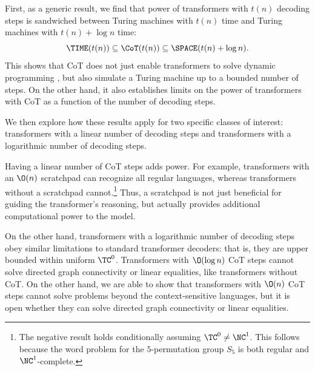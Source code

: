 First, as a generic result, we find that power of transformers with $t(n)$ decoding steps is sandwiched between Turing machines with $t(n)$ time and Turing machines with $t(n) + \log n$ time:
\begin{equation*}
    \TIME(t(n)) \subseteq \CoT(t(n)) \subseteq \SPACE(t(n) + \log n) .
\end{equation*}
This shows that CoT does not just enable transformers to solve dynamic programming \citep{feng2023revealing}, but also simulate a Turing machine up to a bounded number of steps. On the other hand, it also establishes limits on the power of transformers with CoT as a function of the number of decoding steps.

We then explore how these results apply for two specific classes of interest: transformers with a linear number of decoding steps and transformers with a logarithmic number of decoding steps.

Having a linear number of CoT steps adds power.
For example, transformers with an $\O(n)$ scratchpad can recognize all regular languages, whereas transformers without a scratchpad cannot.\footnote{The negative result holds conditionally assuming $\TC^0 \neq \NC^1$. This follows because the word problem for the $5$-permutation group $S_5$ is both regular and $\NC^1$-complete.}
Thus, a scratchpad is not just beneficial for guiding the transformer's reasoning, but actually provides additional computational power to the model.

On the other hand, transformers with a logarithmic number of decoding steps obey similar limitations to standard transformer decoders: that is, they are upper bounded within uniform $\TC^0$. Transformers with $\O(\log n)$ CoT steps cannot solve directed graph connectivity or linear equalities, like transformers without CoT. On the other hand, we are able to show that transformers with $\O(n)$ CoT steps cannot solve problems beyond the context-sensitive languages, but it is open whether they can solve directed graph connectivity or linear equalities.


